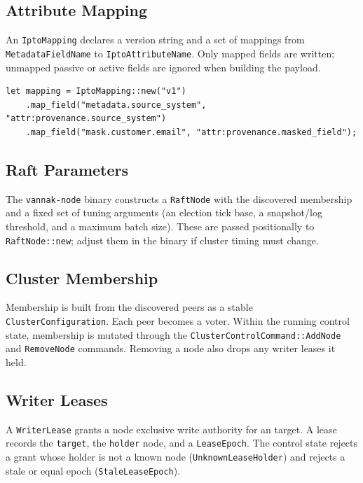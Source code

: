 \subsection{Attribute Mapping}

An \texttt{IptoMapping} declares a version string and a set of mappings from
\texttt{MetadataFieldName} to \texttt{IptoAttributeName}. Only mapped fields are
written; unmapped passive or active fields are ignored when building the
payload.

\begin{lstlisting}
let mapping = IptoMapping::new("v1")
    .map_field("metadata.source_system", "attr:provenance.source_system")
    .map_field("mask.customer.email", "attr:provenance.masked_field");
\end{lstlisting}

\subsection{Raft Parameters}

The \texttt{vannak-node} binary constructs a \texttt{RaftNode} with the
discovered membership and a fixed set of tuning arguments (an election tick
base, a snapshot/log threshold, and a maximum batch size). These are passed
positionally to \texttt{RaftNode::new}; adjust them in the binary if cluster
timing must change.

\subsection{Cluster Membership}

Membership is built from the discovered peers as a stable
\texttt{ClusterConfiguration}. Each peer becomes a voter. Within the running
control state, membership is mutated through the
\texttt{ClusterControlCommand::AddNode} and \texttt{RemoveNode} commands.
Removing a node also drops any writer leases it held.

\subsection{Writer Leases}

A \texttt{WriterLease} grants a node exclusive write authority for an \ipto{}
target. A lease records the \texttt{target}, the \texttt{holder} node, and a
\texttt{LeaseEpoch}. The control state rejects a grant whose holder is not a
known node (\texttt{UnknownLeaseHolder}) and rejects a stale or equal epoch
(\texttt{StaleLeaseEpoch}).

